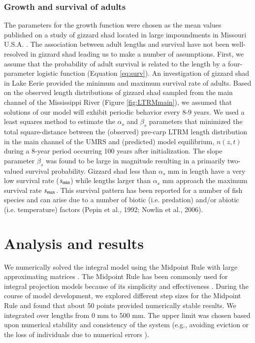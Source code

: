 \documentclass[preprint,review,12pt,authoryear]{elsarticle}
\def\ds{\displaystyle}
\begin{document}
\subsubsection{Growth and survival of adults}
The parameters for the growth function were chosen as the mean values published on a study of gizzard shad located in large impoundments in Missouri U.S.A. \citep{michaletz2017variation}. 
The association between adult lengths and survival have not been well-resolved in gizzard shad leading us to make a number of assumptions.  
First, we assume that the probability of adult survival is related to the length by a four-parameter logistic function (Equation \ref{eq:surv}).
An investigation of gizzard shad in Lake Eerie \citep{bodola1955life} provided the minimum and maximum survival rate of adults. 
Based on the observed length distributions of gizzard shad sampled from the main channel of the Mississippi River (Figure \ref{fig:LTRMmain}), we assumed that solutions of our model will exhibit periodic behavior every 8-9 years.   
We used a least squares method to estimate the $\alpha_s$ and $\beta_s$ parameters that 
minimized the total square-distance between the (observed) pre-carp LTRM length distribution in the main channel of the UMRS and (predicted) model equilibrium, $n(z,t)$ during a 8-year period occurring 100 years after initialization.  
The slope parameter $\beta_s$ was found to be large in magnitude resulting in a primarily two-valued survival probability.  
Gizzard shad less than $\alpha_s$ mm in length have a very low survival rate ($\ds s_{\rm {min}}$) while lengths larger than  $\alpha_s$ mm approach the maximum survival rate $\ds s_{\rm {max}}$. 
This survival pattern has been reported for a number of fish species and can arise due to a number of biotic (i.e. predation) and/or abiotic (i.e. temperature) factors (Pepin et al., 1992; Nowlin et al., 2006). 
\section{Analysis and results}
We numerically solved the integral model using the Midpoint Rule with large approximating matrices \citep{burden2005numerical}. 
The Midpoint Rule has been commonly used for integral projection models because of its simplicity and effectiveness \citep{ellner2006integral, ramula2009integral,  merow2014advancing}. 
During the course of model development, we explored different step sizes for the Midpoint Rule and found that about 50 points provided numerically stable results. 
We integrated over lengths from 0 mm to 500 mm. 
The upper limit was chosen based upon numerical stability and consistency of the system (e.g., avoiding eviction or the loss of individuals due to numerical errors \citep{williams2012avoiding}). 
\end{document}
